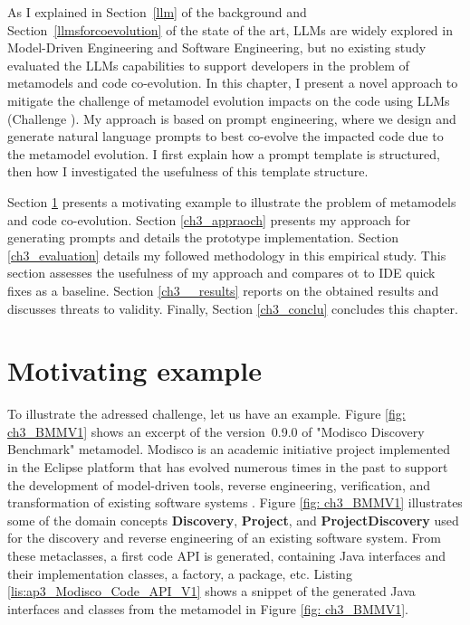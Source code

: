 As I explained in Section~\ref{llm} of the background and Section~\ref{llmsforcoevolution} of the state of the art, LLMs are widely explored in Model-Driven Engineering and Software Engineering, but no existing study evaluated the LLMs capabilities 
to support developers in the problem of metamodels and code co-evolution. 
In this chapter, I present a novel approach to mitigate the challenge of metamodel evolution impacts on the code using LLMs (Challenge ). 
My approach is based on prompt engineering, where we design and generate natural language prompts to best co-evolve the impacted code due to the metamodel evolution. I first explain how a prompt template is structured, then how I investigated the usefulness of this template structure. 

  Section \ref{ch3_example} presents a motivating example to illustrate the problem of metamodels and code co-evolution. Section \ref{ch3_appraoch} presents my approach for generating prompts and details the prototype implementation.  Section \ref{ch3_evaluation} details my followed methodology in this empirical study. This section assesses the usefulness of my approach and compares ot to IDE quick fixes as a baseline. Section \ref{ch3__results} reports on the obtained results and discusses threats to validity. Finally, Section \ref{ch3_conclu} concludes this chapter. 

\section{Motivating example}
\label{ch3_example}


To illustrate the adressed challenge, let us have an example. 
Figure \ref{fig: ch3_BMMV1} shows an excerpt of the  version~0.9.0 of "Modisco Discovery Benchmark" metamodel. %
Modisco is an academic initiative project implemented in the Eclipse platform that has evolved numerous times in the past to support the development of model-driven tools, reverse engineering, verification, and transformation of existing software systems \cite{bruneliere2010modisco,bruneliere2014modisco}.
Figure \ref{fig: ch3_BMMV1} illustrates  some of the domain concepts \textbf{Discovery}, \textbf{Project}, and \textbf{ProjectDiscovery}  used for the discovery and reverse engineering of an existing software system. 
From these metaclasses, a first code API is generated, containing Java interfaces and their implementation classes, a factory, a package, etc. %
Listing \ref{lis:ap3_Modisco_Code_API_V1} shows a snippet of the generated Java interfaces and classes from the metamodel in Figure \ref{fig: ch3_BMMV1}. 

